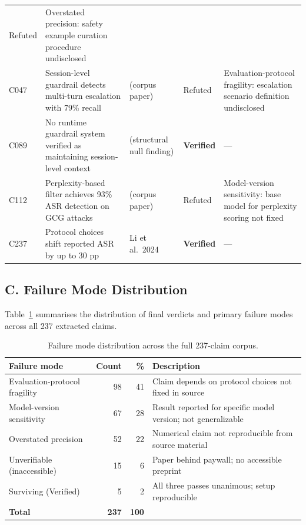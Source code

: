 \begin{longtable}{@{}p{1.2cm}p{4.8cm}p{2.2cm}p{1.8cm}p{3.4cm}@{}}
  Refuted &
  Overstated precision: safety example curation procedure undisclosed \\[4pt]
C047 &
  Session-level guardrail detects multi-turn escalation with 79\% recall &
  (corpus paper) &
  Refuted &
  Evaluation-protocol fragility: escalation scenario definition undisclosed \\[4pt]
C089 &
  No runtime guardrail system verified as maintaining session-level context &
  (structural null finding) &
  \textbf{Verified} &
  — \\[4pt]
C112 &
  Perplexity-based filter achieves 93\% ASR detection on GCG attacks &
  (corpus paper) &
  Refuted &
  Model-version sensitivity: base model for perplexity scoring not fixed \\[4pt]
C237 &
  Protocol choices shift reported ASR by up to 30 pp~\cite{li2024salad} &
  Li et al.\ 2024 &
  \textbf{Verified} &
  — \\
\end{longtable}

\subsection*{C. Failure Mode Distribution}

Table~\ref{tab:failure_modes} summarises the distribution of final verdicts
and primary failure modes across all 237 extracted claims.

\begin{table}[h]
\centering\small
\caption{Failure mode distribution across the full 237-claim corpus.}
\label{tab:failure_modes}
\begin{tabular}{@{}p{4.2cm}rrp{6.0cm}@{}}
\toprule
\textbf{Failure mode} & \textbf{Count} & \textbf{\%} & \textbf{Description} \\
\midrule
Evaluation-protocol fragility  & 98  & 41 &
  Claim depends on protocol choices not fixed in source \\
Model-version sensitivity      & 67  & 28 &
  Result reported for specific model version; not generalizable \\
Overstated precision           & 52  & 22 &
  Numerical claim not reproducible from source material \\
Unverifiable (inaccessible)    & 15  &  6 &
  Paper behind paywall; no accessible preprint \\
Surviving (Verified)           &  5  &  2 &
  All three passes unanimous; setup reproducible \\
\midrule
\textbf{Total}                 & \textbf{237} & \textbf{100} & \\
\bottomrule
\end{tabular}
\end{table}


